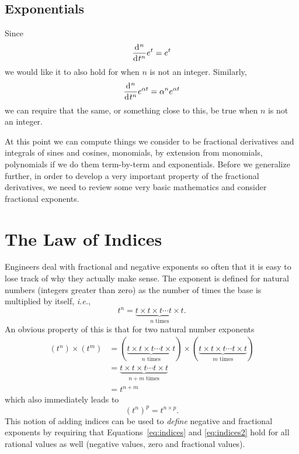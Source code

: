 \subsection{Exponentials}
Since
\begin{equation*}
  \frac{\operatorname{d}\hspace*{-1pt}^n}{\operatorname{d}\hspace*{-1pt} t^n}e^t = e^t
\end{equation*}
we would like it to also hold for when $n$ is not an integer.  Similarly, 
\begin{equation*}
  \frac{\operatorname{d}\hspace*{-1pt}^n}{\operatorname{d}\hspace*{-1pt} t^n} e^{\alpha t} = \alpha^n e^{\alpha t}
\end{equation*}
we can require that the same, or something close to this, be true when $n$ is not an integer.

At this point we can compute things we consider to be fractional derivatives and integrals of sines and cosines, monomials, by extension from monomials, polynomials if we do them term-by-term and exponentials.  Before we generalize further, in order to develop a very important property of the fractional derivatives, we need to review some very basic mathematics and consider fractional exponents.


\section{The Law of Indices}
\label{sec:indices}
Engineers deal with fractional and negative exponents so often that it is easy to lose track of why they actually make sense. The exponent is defined for natural numbers (integers greater than zero) as the number of times the base is multiplied by itself, \textit{i.e.},
\begin{equation}
  t^n = \underbrace{t \times t \times t \cdots t \times t}_{\mbox{$n$ times}}.
  \label{eq:power}
\end{equation}
An obvious property of this is that for two natural number exponents
\begin{align}
  \left(t^n\right) \times \left( t^m \right) &=  \left( \underbrace{t \times t \times t \cdots t \times t}_{\mbox{$n$ times}}
  \right) \times \left( \underbrace{t \times t \times t \cdots t \times t}_{\mbox{$m$ times}}
  \right) \\
  &= 
  \underbrace{t \times t \times t \cdots t \times t}_{\mbox{$n + m$ times}} \\
  &= t^{n + m}
  \label{eq:indices}
\end{align}
which also immediately leads to
\begin{equation}
  \left( t^n \right)^p = t^{n \times p}.
  \label{eq:indices2}
\end{equation}
This notion of adding indices can be used to \emph{define} negative and fractional exponents by requiring that Equations~\ref{eq:indices} and \ref{eq:indices2} hold for all rational values as well (negative values, zero and fractional values). 

